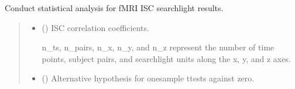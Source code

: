 \documentclass[letterpaper,10pt,english]{sphinxhowto}
\begin{document}
\begin{fulllineitems}
\label{\detokenize{stats_cal:neurora.stats_cal.stats_iscfmri}}
\pysigstartsignatures
{}
\pysigstopsignatures
\sphinxAtStartPar
Conduct statistical analysis for fMRI ISC searchlight results.
\begin{quote}\begin{description}
\begin{itemize}
\item {} 
\sphinxAtStartPar
{} (\sphinxstyleliteralemphasis{\sphinxupquote{, }}\sphinxstyleliteralemphasis{\sphinxupquote{ {[}}}\sphinxstyleliteralemphasis{\sphinxupquote{, }}\sphinxstyleliteralemphasis{\sphinxupquote{, }}\sphinxstyleliteralemphasis{\sphinxupquote{, }}\sphinxstyleliteralemphasis{\sphinxupquote{, }}\sphinxstyleliteralemphasis{\sphinxupquote{{]}}}) \textendash{} 
\sphinxAtStartPar
ISC correlation coefficients.

\sphinxAtStartPar
n\_ts, n\_pairs, n\_x, n\_y, and n\_z represent the number of time points,
subject pairs, and searchlight units along the x, y, and z axes.


\item {} 
\sphinxAtStartPar
{} (\sphinxstyleliteralemphasis{\sphinxupquote{, }}\sphinxstyleliteralemphasis{\sphinxupquote{, }}\sphinxstyleliteralemphasis{\sphinxupquote{, }}) \textendash{} Alternative hypothesis for one\sphinxhyphen{}sample t\sphinxhyphen{}tests against zero.

\end{itemize}


\end{description}
\end{quote}
\end{fulllineitems}
\end{document}
